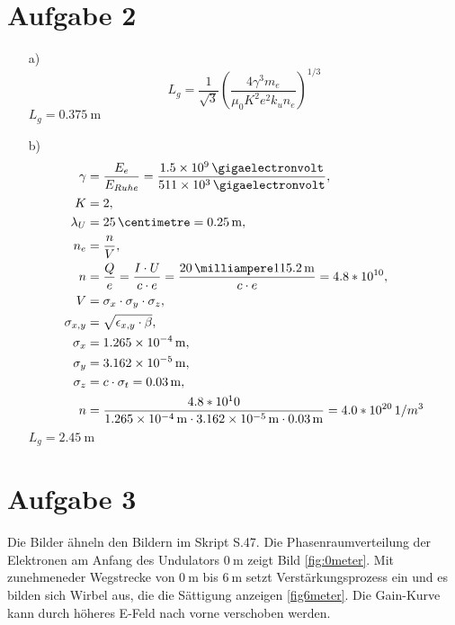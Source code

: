 \documentclass[11pt,a4paper]{article}
\begin{document}
    \section*{Aufgabe 2}
	\begin{itemize}
		\item[a)] 
			\begin{equation*}
				L_{g} = \frac{1}{\sqrt{3}} (\frac{4 \gamma^3 m_{e}}{\mu_0 K^2 e^2 k_{u} n_{e}})^{1/3}
			\end{equation*}
			$L_{g} = \SI{0.375}{\meter}$
		\item[b)]
			\begin{align*}
				\gamma &= \frac{ E_{e} }{ E_{Ruhe} } = \frac{ \SI{1.5e9}{\gigaelectronvolt} }{ \SI{511e3}{\gigaelectronvolt} }, \\
				K &= 2, \\
				\lambda_{U} &= \SI{25}{\centimetre} = \SI{0.25}{\metre}, \\
				n_{e} &= \frac{n}{V}, \\
				n &= \frac{Q}{e} = \frac{I \cdot U}{c \cdot e} = \frac{ \SI{20}{\milliampere} \SI{115.2}{\metre}}{c \cdot e} = 4.8*10^{10}, \\
				V &= \sigma_{x} \cdot \sigma_{y} \cdot \sigma_{z}, \\
				\sigma_{x,y} &= \sqrt{\epsilon_{x,y} \cdot \beta}, \\
				\sigma_{x} &= \SI{1.265e-4}{\metre}, \\
				\sigma_{y} &= \SI{3.162e-5}{\metre}, \\
				\sigma_{z} &= c \cdot \sigma_{t} = \SI{0.03}{\metre}, \\
				n &= \frac{4.8*10^10}{  \SI{1.265e-4}{\metre} \cdot \SI{3.162e-5}{\meter} \cdot \SI{0.03}{\metre} } = 4.0*10^{20} \, 1/m^{3}
			\end{align*}
			$L_{g} = \SI{2.45}{\metre}$
	\end{itemize}

	\section*{Aufgabe 3}
	
	Die Bilder ähneln den Bildern im Skript S.47. Die Phasenraumverteilung der Elektronen am Anfang des Undulators $\SI{0}{\metre}$ zeigt Bild \ref{fig:0meter}. Mit zunehmeneder Wegstrecke von $\SI{0}{\metre}$ 
	bis $\SI{6}{\metre}$ setzt Verstärkungsprozess ein und es bilden sich Wirbel aus, die die Sättigung anzeigen \ref{fig6meter}.
	Die Gain-Kurve kann durch höheres E-Feld nach vorne verschoben werden.
\end{document}
